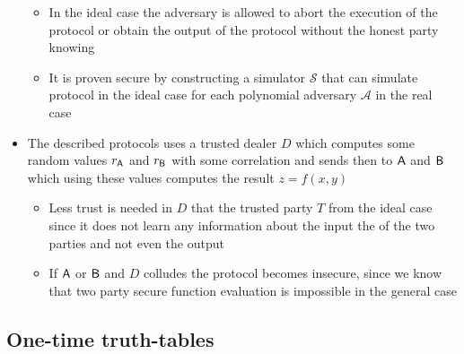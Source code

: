 \begin{itemize}
    \begin{itemize}
        \item In the ideal case the adversary is allowed to abort the execution of the protocol or obtain the output of the protocol without the honest party knowing
        \item It is proven secure by constructing a simulator $\mathcal S$ that can simulate protocol in the ideal case for each polynomial adversary $\mathcal A$ in the real case
    \end{itemize}
    \item The described protocols uses a trusted dealer $D$ which computes some random values $r_{\mathsf{A}}$ and $r_{\mathsf{B}}$ with some correlation and sends then to $\mathsf{A}$ and $\mathsf{B}$ which using these values computes the result $z = f(x,y)$
    \begin{itemize}
        \item Less trust is needed in $D$ that the trusted party $T$ from the ideal case since it does not learn any information about the input the of the two parties and not even the output
        \item If $\mathsf{A}$ or $\mathsf{B}$ and $D$ colludes the protocol becomes insecure, since we know that two party secure function evaluation is impossible in the general case
    \end{itemize}
\end{itemize}

\subsection{One-time truth-tables}%
